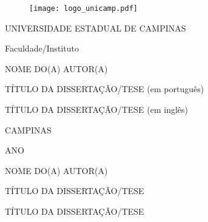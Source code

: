 
\thispagestyle{empty}

\begin{figure}[t]
  \begin{flushleft}
  \texttt{[image: logo\_unicamp.pdf]}
  \end{flushleft}
\end{figure}

\begin{center}
UNIVERSIDADE ESTADUAL DE CAMPINAS

Faculdade/Instituto
\end{center}

\vspace{\fill}

\begin{center}
NOME DO(A) AUTOR(A)
\end{center}

\vspace{\fill}

\begin{center}
TÍTULO DA DISSERTAÇÃO/TESE (em português)
\end{center}

\vspace{\fill}

\begin{center}
TÍTULO DA DISSERTAÇÃO/TESE (em inglês)
\end{center}

\vspace{\fill}
\begin{center}
CAMPINAS

ANO
\end{center}

\newpage

\thispagestyle{empty}

\begin{center}
NOME DO(A) AUTOR(A)
\end{center}

\vspace{\fill} 

\begin{center}
TÍTULO DA DISSERTAÇÃO/TESE

\vspace*{1\baselineskip}

TÍTULO DA DISSERTAÇÃO/TESE
\end{center}

